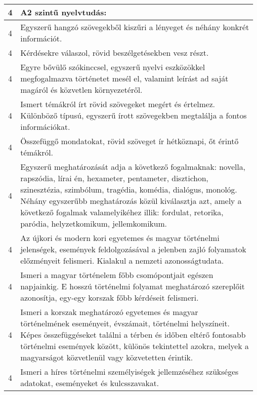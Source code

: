 \begin{longtable}{c | p{12cm} }
                                
                                          4 &  A2 szintű nyelvtudás: \\ \hline
                                          4 &  Egyszerű hangzó szövegekből kiszűri a lényeget és néhány konkrét információt. \\ \hline
                                          4 &  Kérdésekre válaszol, rövid beszélgetésekben vesz részt. \\ \hline
                                          4 &  Egyre bővülő szókinccsel, egyszerű nyelvi eszközökkel megfogalmazva történetet mesél el, valamint leírást ad saját magáról és közvetlen környezetéről. \\ \hline
                                          4 &  Ismert témákról írt rövid szövegeket megért és értelmez. Különböző típusú, egyszerű írott szövegekben megtalálja a fontos információkat. \\ \hline
                                          4 &  Összefüggő mondatokat, rövid szöveget ír hétköznapi, őt érintő témákról. \\ \hline
                                          4 &  Egyszerű meghatározását adja a következő fogalmaknak: novella, rapszódia, lírai én, hexameter, pentameter, disztichon, szinesztézia, szimbólum, tragédia, komédia, dialógus, monológ. Néhány egyszerűbb meghatározás közül kiválasztja azt, amely a következő fogalmak valamelyikéhez illik: fordulat, retorika, paródia, helyzetkomikum, jellemkomikum. \\ \hline
                                          4 &  Az újkori és modern kori egyetemes és magyar történelmi jelenségek, események feldolgozásával a jelenben zajló folyamatok előzményeit felismeri. Kialakul a nemzeti azonosságtudata. \\ \hline
                                          4 &  Ismeri a magyar történelem főbb csomópontjait egészen napjainkig. E hosszú történelmi folyamat meghatározó szereplőit azonosítja, egy-egy korszak főbb kérdéseit felismeri. \\ \hline
                                          4 &  Ismeri a korszak meghatározó egyetemes és magyar történelmének eseményeit, évszámait, történelmi helyszíneit. Képes összefüggéseket találni a térben és időben eltérő fontosabb történelmi események között, különös tekintettel azokra, melyek a magyarságot közvetlenül vagy közvetetten érintik. \\ \hline
                                          4 &  Ismeri a híres történelmi személyiségek jellemzéséhez szükséges adatokat, eseményeket és kulcsszavakat. \\ \hline

\end{longtable}

